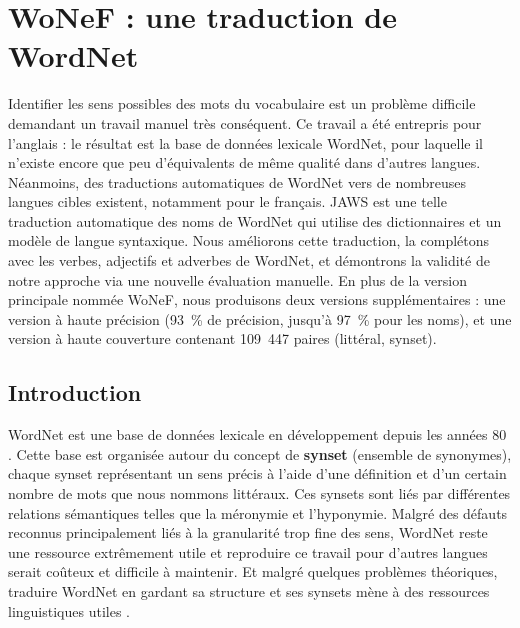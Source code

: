 \chapter{WoNeF : une traduction de WordNet}
\label{ch:wonef} 

Identifier les sens possibles des mots du vocabulaire est un problème difficile
demandant un travail manuel très conséquent.
Ce travail a été entrepris pour l'anglais : le résultat est la base de données
lexicale WordNet, pour laquelle il n'existe encore que peu d'équivalents de
même qualité dans d'autres langues.  Néanmoins, des traductions automatiques de
WordNet vers de nombreuses langues cibles existent, notamment pour le français.
JAWS est une telle traduction automatique des noms de WordNet qui utilise des
dictionnaires et un modèle de langue syntaxique. Nous améliorons cette
traduction, la complétons avec les verbes, adjectifs et adverbes de WordNet, et
démontrons la validité de notre approche via une nouvelle évaluation manuelle.
En plus de la version principale nommée WoNeF, nous produisons deux versions
supplémentaires : une version à haute précision (93~\% de précision, jusqu'à
97~\% pour les noms), et une version à haute couverture contenant 109~447
paires (littéral, synset).


\section{Introduction}
\label{sec:intro}

WordNet est une base de données lexicale en développement depuis les années 80
\citep{fellbaum1998wordnet}. Cette base est organisée autour du concept de
\textbf{synset} (ensemble de synonymes), chaque synset représentant un sens
précis à l'aide d'une définition et d'un certain nombre de mots que nous
nommons littéraux. Ces synsets sont liés par différentes relations sémantiques
telles que la méronymie et l'hyponymie.
Malgré des défauts reconnus \citep{boyd2006adding} principalement liés à la
granularité trop fine des sens, WordNet reste une ressource extrêmement utile
et reproduire ce travail pour d'autres langues serait coûteux et difficile à
maintenir. Et malgré quelques problèmes théoriques, traduire WordNet en gardant
sa structure et ses synsets mène à des ressources linguistiques utiles
\citep{fellbaum2007connecting,demelo2008utility}.


